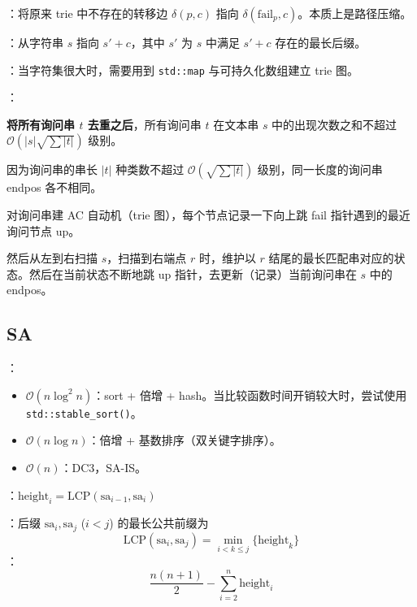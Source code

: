 ：将原来 trie 中不存在的转移边 $\delta(p, c)$ 指向 $\delta(\mathrm{fail}_p, c)$。本质上是路径压缩。

：从字符串 $s$ 指向 $s' + c$，其中 $s'$ 为 $s$ 中满足 $s' + c$ 存在的最长后缀。


：当字符集很大时，需要用到 \texttt{std::map} 与可持久化数组建立 trie 图。


：

\textbf{将所有询问串 $t$ 去重之后}，所有询问串 $t$ 在文本串 $s$ 中的出现次数之和不超过 $\mathcal{O}(|s|\sqrt{\sum |t|})$ 级别。

因为询问串的串长 $|t|$ 种类数不超过 $\mathcal{O}(\sqrt{\sum |t|})$ 级别，同一长度的询问串 endpos 各不相同。

对询问串建 AC 自动机（trie 图），每个节点记录一下向上跳 fail 指针遇到的最近询问节点 up。

然后从左到右扫描 $s$，扫描到右端点 $r$ 时，维护以 $r$ 结尾的最长匹配串对应的状态。然后在当前状态不断地跳 up 指针，去更新（记录）当前询问串在 $s$ 中的 endpos。

\subsection{SA}

：

\begin{itemize}
    \item $\mathcal{O}(n \log^2 n)$：sort + 倍增 + hash。当比较函数时间开销较大时，尝试使用 \texttt{std::stable\_sort()}。
    \item $\mathcal{O}(n \log n)$：倍增 + 基数排序（双关键字排序）。
    \item $\mathcal{O}(n)$：DC3，SA-IS。
\end{itemize}

：$\mathrm{height}_i = \mathrm{LCP}(\mathrm{sa}_{i - 1}, \mathrm{sa}_i)$

：后缀 $\mathrm{sa}_i, \mathrm{sa}_j$ ($i < j$) 的最长公共前缀为
\[
\mathrm{LCP}(\mathrm{sa}_i, \mathrm{sa}_j) = \min_{i < k \leq j}\{\mathrm{height}_k\}
\]
：
\[
\frac{n(n + 1)}{2} - \sum_{i = 2}^n \mathrm{height}_i
\]

